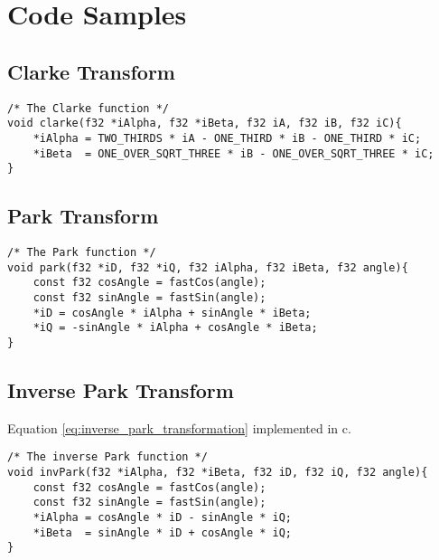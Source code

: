 \section{Code Samples}
\label{app:code_samples}
\subsection{Clarke Transform}
\label{app:clark}


\begin{lstlisting}[style=c, caption=Embedded Clarke Transformation., label=app:code:clarke]
/* The Clarke function */
void clarke(f32 *iAlpha, f32 *iBeta, f32 iA, f32 iB, f32 iC){
	*iAlpha = TWO_THIRDS * iA - ONE_THIRD * iB - ONE_THIRD * iC;
	*iBeta  = ONE_OVER_SQRT_THREE * iB - ONE_OVER_SQRT_THREE * iC;
}
\end{lstlisting}

\subsection{Park Transform}
\label{app:park}

\begin{lstlisting}[style=c, caption=Embedded Park Transformation., label=app:code:park]
/* The Park function */
void park(f32 *iD, f32 *iQ, f32 iAlpha, f32 iBeta, f32 angle){
	const f32 cosAngle = fastCos(angle);
	const f32 sinAngle = fastSin(angle);
	*iD = cosAngle * iAlpha + sinAngle * iBeta;
	*iQ = -sinAngle * iAlpha + cosAngle * iBeta;
}
\end{lstlisting}


\subsection{Inverse Park Transform}
\label{app:inverse_park}
Equation \ref{eq:inverse_park_transformation} implemented in c.

\begin{lstlisting}[style=c, caption=Embedded Inverse Park Transformation., label=app:code:inverse_park]
/* The inverse Park function */
void invPark(f32 *iAlpha, f32 *iBeta, f32 iD, f32 iQ, f32 angle){
	const f32 cosAngle = fastCos(angle);
	const f32 sinAngle = fastSin(angle);
	*iAlpha = cosAngle * iD - sinAngle * iQ;
	*iBeta  = sinAngle * iD + cosAngle * iQ;
}
\end{lstlisting}



